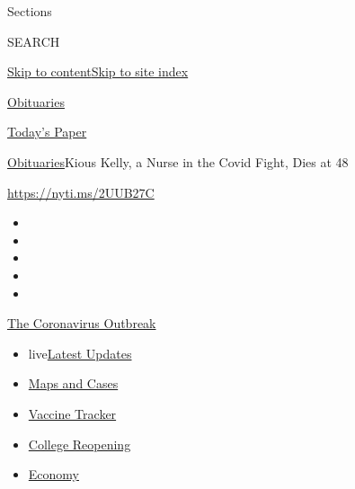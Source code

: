 Sections

SEARCH

\protect\hyperlink{site-content}{Skip to
content}\protect\hyperlink{site-index}{Skip to site index}

\href{https://www.nytimes.com/section/obituaries}{Obituaries}

\href{https://myaccount.nytimes.com/auth/login?response_type=cookie\&client_id=vi}{}

\href{https://www.nytimes.com/section/todayspaper}{Today's Paper}

\href{/section/obituaries}{Obituaries}\textbar{}Kious Kelly, a Nurse in
the Covid Fight, Dies at 48

\url{https://nyti.ms/2UUB27C}

\begin{itemize}
\item
\item
\item
\item
\item
\end{itemize}

\href{https://www.nytimes.com/news-event/coronavirus?action=click\&pgtype=Article\&state=default\&region=TOP_BANNER\&context=storylines_menu}{The
Coronavirus Outbreak}

\begin{itemize}
\tightlist
\item
  live\href{https://www.nytimes.com/2020/08/03/world/coronavirus-covid-19.html?action=click\&pgtype=Article\&state=default\&region=TOP_BANNER\&context=storylines_menu}{Latest
  Updates}
\item
  \href{https://www.nytimes.com/interactive/2020/us/coronavirus-us-cases.html?action=click\&pgtype=Article\&state=default\&region=TOP_BANNER\&context=storylines_menu}{Maps
  and Cases}
\item
  \href{https://www.nytimes.com/interactive/2020/science/coronavirus-vaccine-tracker.html?action=click\&pgtype=Article\&state=default\&region=TOP_BANNER\&context=storylines_menu}{Vaccine
  Tracker}
\item
  \href{https://www.nytimes.com/2020/08/02/us/covid-college-reopening.html?action=click\&pgtype=Article\&state=default\&region=TOP_BANNER\&context=storylines_menu}{College
  Reopening}
\item
  \href{https://www.nytimes.com/live/2020/08/03/business/stock-market-today-coronavirus?action=click\&pgtype=Article\&state=default\&region=TOP_BANNER\&context=storylines_menu}{Economy}
\end{itemize}

